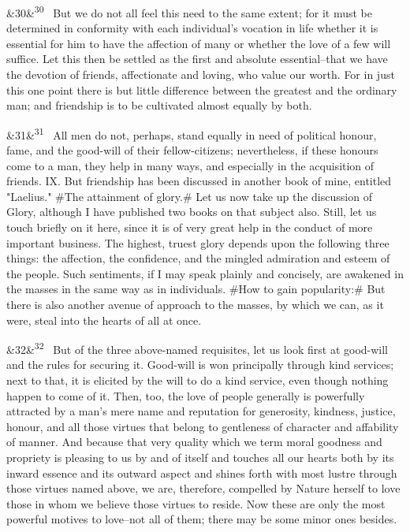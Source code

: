 \documentclass[12pt]{article}
\newcommand{\para}[1][]{\par\noindent\ifx&#1&\else\textsuperscript{\footnotesize #1}~\fi}
\begin{document}
\para[30] But we do not all feel this need to the same extent; for it must be determined in conformity with each individual's vocation in life whether it is essential for him to have the affection of many or whether the love of a few will suffice. Let this then be settled as the first and absolute essential--that we have the devotion of friends, affectionate and loving, who value our worth. For in just this one point there is but little difference between the greatest and the ordinary man; and friendship is to be cultivated almost equally by both.

\para[31] All men do not, perhaps, stand equally in need of political honour, fame, and the good-will of their fellow-citizens; nevertheless, if these honours come to a man, they help in many ways, and especially in the acquisition of friends. IX. But friendship has been discussed in another book of mine, entitled "Laelius." \#The attainment of glory.\# Let us now take up the discussion of Glory, although I have published two books on that subject also. Still, let us touch briefly on it here, since it is of very great help in the conduct of more important business. The highest, truest glory depends upon the following three things: the affection, the confidence, and the mingled admiration and esteem of the people. Such sentiments, if I may speak plainly and concisely, are awakened in the masses in the same way as in individuals. \#How to gain popularity:\# But there is also another avenue of approach to the masses, by which we can, as it were, steal into the hearts of all at once.

\para[32] But of the three above-named requisites, let us look first at good-will and the rules for securing it. Good-will is won principally through kind services; next to that, it is elicited by the will to do a kind service, even though nothing happen to come of it. Then, too, the love of people generally is powerfully attracted by a man's mere name and reputation for generosity, kindness, justice, honour, and all those virtues that belong to gentleness of character and affability of manner. And because that very quality which we term moral goodness and propriety is pleasing to us by and of itself and touches all our hearts both by its inward essence and its outward aspect and shines forth with most lustre through those virtues named above, we are, therefore, compelled by Nature herself to love those in whom we believe those virtues to reside. Now these are only the most powerful motives to love--not all of them; there may be some minor ones besides.
\end{document}
